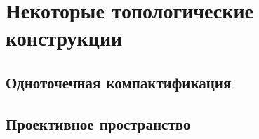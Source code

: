 \section{Некоторые топологические конструкции}
\subsection{Одноточечная компактификация}
\subsection{Проективное пространство}

